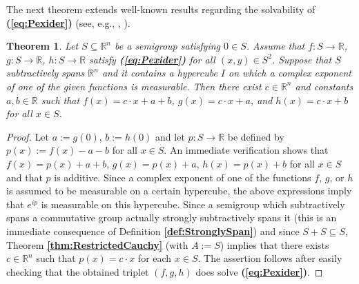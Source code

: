 \documentclass[12 pt]{amsart}
\newtheorem{thm}{Theorem}[section]
\theoremstyle{definition}
\newcommand{\R}{\mathbb{R}}
\newcommand{\bref}[1]{\textbf{\ref{#1}}} %
\newcommand{\beqref}[1]{\textbf{(\ref{#1})}} %
\begin{document}
The next theorem extends well-known results regarding the solvability of \beqref{eq:Pexider}  (see, e.g., \cite[Corollary, p. 142]{Aczel}, \cite[Theorem 13.3.9, p. 363]{Kuczma2009book}). 
\begin{thm}\label{thm:Pexider}
Let $S\subseteq \R^n$ be a semigroup satisfying $0\in S$. Assume that $f:S\to\R$, $g:S\to\R$, $h:S\to\R$ 
satisfy \beqref{eq:Pexider} for all $(x,y)\in S^2$. Suppose that $S$ subtractively spans 
$\R^n$ and it contains a hypercube $I$ on which a complex exponent of one of 
the given functions is measurable. 
Then there exist $c\in \R^n$ and constants $a,b\in\R$ such that $f(x)=c\cdot x+a+b$, $g(x)=c\cdot x+a$, 
and $h(x)=c\cdot x+b$ for all $x\in S$.
\end{thm}
\begin{proof}
Let $a:=g(0)$, $b:=h(0)$ and let $p:S\to\R$ be defined by $p(x):=f(x)-a-b$ for all $x\in S$. 
An immediate verification shows that 
$f(x)=p(x)+a+b$, $g(x)=p(x)+a$, $h(x)=p(x)+b$ for all $x\in S$ 
and that $p$ is additive. 
Since a complex exponent of one of the functions $f$, $g$, or $h$ is assumed to 
be measurable on a certain hypercube, the above expressions imply that $e^{ip}$ 
is measurable on this hypercube. Since a semigroup which subtractively spans a commutative group actually strongly 
subtractively spans it (this is an immediate consequence of Definition \bref{def:StronglySpan}) and since $S+S\subseteq S$, Theorem \bref{thm:RestrictedCauchy} (with $A:=S$) implies that there exists $c\in\R^n$ 
such that $p(x)=c\cdot x$ 
for each $x\in S$. The assertion follows after easily checking that the 
obtained triplet $(f,g,h)$ does solve \beqref{eq:Pexider}. 
\end{proof}
\end{document}
